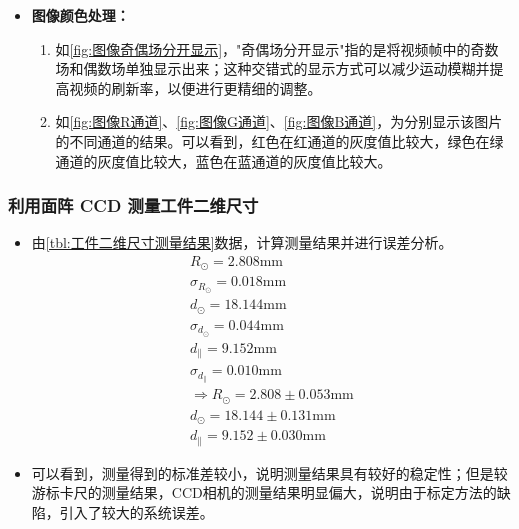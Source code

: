 \documentclass[dvipsnames, svgnames,a4paper,11pt]{article}
\begin{document}
\begin{itemize}
			\item \textbf{图像颜色处理：}
			
				\begin{enumerate}
					\item 如\cref{fig:图像奇偶场分开显示}，"奇偶场分开显示"指的是将视频帧中的奇数场和偶数场单独显示出来；这种交错式的显示方式可以减少运动模糊并提高视频的刷新率，以便进行更精细的调整。

					\item 如\cref{fig:图像R通道}、\cref{fig:图像G通道}、\cref{fig:图像B通道}，为分别显示该图片的不同通道的结果。可以看到，红色在红通道的灰度值比较大，绿色在绿通道的灰度值比较大，蓝色在蓝通道的灰度值比较大。
				\end{enumerate}
		\end{itemize}




















	\subsubsection{利用面阵 CCD 测量工件二维尺寸}

		\begin{itemize}
			\item 由\cref{tbl:工件二维尺寸测量结果}数据，计算测量结果并进行误差分析。
				\begin{align*}
					R_\odot = 2.808 \mathrm{mm}	\\
					\sigma_{R_\odot} = 0.018 \mathrm{mm} \\
					d_\odot = 18.144 \mathrm{mm} \\
					\sigma_{d_\odot} = 0.044 \mathrm{mm} \\
					d_\parallel = 9.152 \mathrm{mm} \\
					\sigma_{d_\parallel} = 0.010 \mathrm{mm} \\
					\Rightarrow R_\odot = 2.808 \pm 0.053 \mathrm{mm} \\
					d_\odot = 18.144 \pm 0.131 \mathrm{mm} \\
					d_\parallel = 9.152 \pm 0.030 \mathrm{mm}
				\end{align*}

			\item 可以看到，测量得到的标准差较小，说明测量结果具有较好的稳定性；但是较游标卡尺的测量结果，CCD相机的测量结果明显偏大，说明由于标定方法的缺陷，引入了较大的系统误差。
		\end{itemize}
\end{document}
